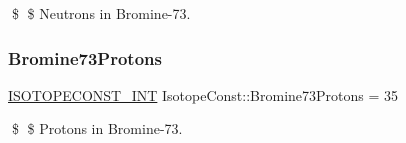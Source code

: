 \$ \$ Neutrons in Bromine-\/73. \mbox{\label{group___isotope_const-_bromine-_br73_ga221e17c32b396b6ed7f94407f33859a8}} 
\subsubsection{\texorpdfstring{Bromine73\+Protons}{Bromine73Protons}}
{\footnotesize\ttfamily \mbox{\hyperlink{group___isotope_const-_macros_ga5f18360b3e99483a35c32d789e62621c}{I\+S\+O\+T\+O\+P\+E\+C\+O\+N\+S\+T\+\_\+\+I\+NT}} Isotope\+Const\+::\+Bromine73\+Protons = 35}

\$ \$ Protons in Bromine-\/73. 